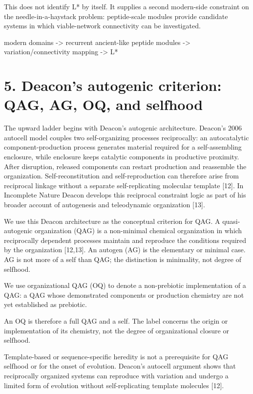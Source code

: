 \documentclass[11pt]{article}
\begin{document}
This does not identify L* by itself. It supplies a second modern-side constraint on the needle-in-a-haystack problem: peptide-scale modules provide candidate systems in which viable-network connectivity can be investigated.

modern domains -\textgreater{} recurrent ancient-like peptide modules -\textgreater{} variation/connectivity mapping -\textgreater{} L*

\hypertarget{deacons-autogenic-criterion-qag-ag-oq-and-selfhood}{%
\section*{5. Deacon's autogenic criterion: QAG, AG, OQ, and selfhood}\label{deacons-autogenic-criterion-qag-ag-oq-and-selfhood}}

The upward ladder begins with Deacon's autogenic architecture. Deacon's 2006 autocell model couples two self-organizing processes reciprocally: an autocatalytic component-production process generates material required for a self-assembling enclosure, while enclosure keeps catalytic components in productive proximity. After disruption, released components can restart production and reassemble the organization. Self-reconstitution and self-reproduction can therefore arise from reciprocal linkage without a separate self-replicating molecular template {[}12{]}. In Incomplete Nature Deacon develops this reciprocal constraint logic as part of his broader account of autogenesis and teleodynamic organization {[}13{]}.

We use this Deacon architecture as the conceptual criterion for QAG. A quasi-autogenic organization (QAG) is a non-minimal chemical organization in which reciprocally dependent processes maintain and reproduce the conditions required by the organization {[}12,13{]}. An autogen (AG) is the elementary or minimal case. AG is not more of a self than QAG; the distinction is minimality, not degree of selfhood.

We use organizational QAG (OQ) to denote a non-prebiotic implementation of a QAG: a QAG whose demonstrated components or production chemistry are not yet established as prebiotic.

An OQ is therefore a full QAG and a self. The label concerns the origin or implementation of its chemistry, not the degree of organizational closure or selfhood.

Template-based or sequence-specific heredity is not a prerequisite for QAG selfhood or for the onset of evolution. Deacon's autocell argument shows that reciprocally organized systems can reproduce with variation and undergo a limited form of evolution without self-replicating template molecules {[}12{]}.
\end{document}
